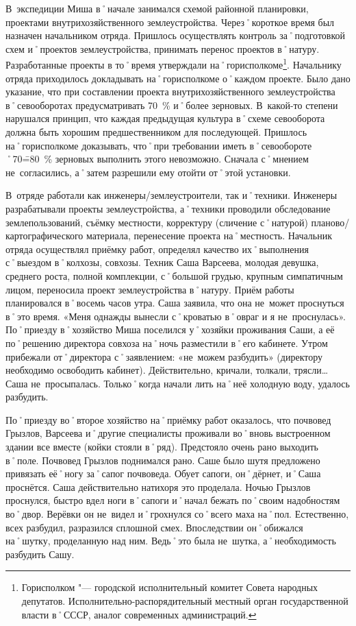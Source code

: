 В~экспедиции Миша в˚начале занимался схемой районной планировки, проектами внутрихозяйственного землеустройства. Через˚короткое время был назначен начальником отряда. Пришлось осуществлять контроль за˚подготовкой схем и˚проектов землеустройства, принимать перенос проектов в˚натуру. Разработанные проекты в то˚время утверждали на˚горисполкоме\footnote{Горисполком "--- городской исполнительный комитет Совета народных депутатов. Исполнительно-распорядительный местный орган государственной власти в˚СССР, аналог современных администраций.}. Начальнику отряда приходилось докладывать на˚горисполкоме о˚каждом проекте. Было дано указание, что при составлении проекта внутрихозяйственного землеустройства в˚севооборотах предусматривать 70~\% и˚более зерновых. В~какой-то степени нарушался принцип, что каждая предыдущая культура в˚схеме севооборота должна быть хорошим предшественником для последующей. Пришлось на˚горисполкоме доказывать, что˚при требовании иметь в˚севообороте ˚70\==80~\% зерновых выполнить этого невозможно. Сначала с˚мнением не~согласились, а˚затем разрешили ему отойти от˚этой установки.

В~отряде работали как инженеры\-/землеустроители, так и˚техники. Инженеры разрабатывали проекты землеустройства, а˚техники проводили обследование землепользований, съёмку местности, корректуру (сличение с˚натурой) планово\-/картографического материала, перенесение проекта на˚местность. Начальник отряда осуществлял приёмку работ, определял качество их˚выполнения с˚выездом в˚колхозы, совхозы. Техник Саша Варсеева, молодая девушка, среднего роста, полной комплекции, с˚большой грудью, крупным симпатичным лицом, переносила проект землеустройства в˚натуру. Приём работы планировался в˚восемь часов утра. Саша заявила, что она не~может проснуться в˚это время. «Меня однажды вынесли с˚кроватью в˚овраг и я не~проснулась». По˚приезду в˚хозяйство Миша поселился у˚хозяйки проживания Саши, а её по˚решению директора совхоза на˚ночь разместили в˚его кабинете. Утром прибежали от˚директора с˚заявлением: «не~можем разбудить» (директору необходимо освободить кабинет). Действительно, кричали, толкали, трясли… Саша не~просыпалась. Только˚когда начали лить на˚неё холодную воду, удалось разбудить.

По˚приезду во˚второе хозяйство на˚приёмку работ оказалось, что почвовед Грызлов, Варсеева и˚другие специалисты проживали во˚вновь выстроенном здании все вместе (койки стояли в˚ряд). Предстояло очень рано выходить в˚поле. Почвовед Грызлов поднимался рано. Саше было шутя предложено привязать её˚ногу за˚сапог почвоведа. Обует сапоги, он˚дёрнет, и˚Саша проснётся. Саша действительно натихоря это проделала. Ночью Грызлов проснулся, быстро вдел ноги в˚сапоги и˚начал бежать по˚своим надобностям во˚двор. Верёвки он не~видел и˚грохнулся со˚всего маха на˚пол. Естественно, всех разбудил, разразился сплошной смех. Впоследствии он˚обижался на˚шутку, проделанную над ним. Ведь˚это была не~шутка, а˚необходимость разбудить Сашу.

